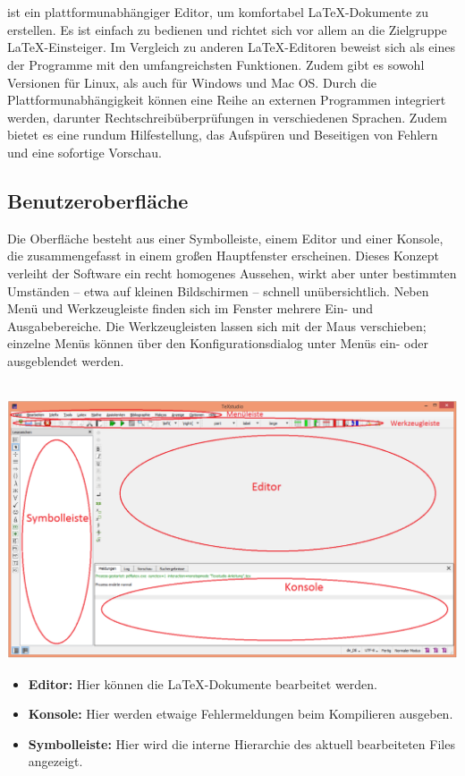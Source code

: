 \section{\texstud}
\texstud  ist ein plattformunabhängiger Editor, um komfortabel \LaTeX -Dokumente zu
erstellen. Es ist einfach zu bedienen und richtet sich vor allem an die Zielgruppe \LaTeX -Einsteiger.
Im Vergleich zu anderen \LaTeX -Editoren beweist sich \texstud als eines der
Programme mit den umfangreichsten Funktionen. Zudem gibt es sowohl Versionen für
Linux, als auch für Windows und Mac OS. Durch die Plattformunabhängigkeit können
eine Reihe an externen Programmen integriert werden, darunter Rechtschreibüberprüfungen in verschiedenen Sprachen. Zudem bietet es eine rundum
Hilfestellung, das Aufspüren und Beseitigen von Fehlern und eine sofortige Vorschau.

\subsection{Benutzeroberfläche}
Die Oberfläche besteht aus einer Symbolleiste, einem Editor und einer Konsole, die
zusammengefasst in einem großen Hauptfenster erscheinen. Dieses Konzept verleiht der
Software ein recht homogenes Aussehen, wirkt aber unter bestimmten Umständen – etwa
auf kleinen Bildschirmen – schnell unübersichtlich. Neben Menü und Werkzeugleiste finden sich im Fenster mehrere Ein- und Ausgabebereiche. Die Werkzeugleisten lassen sich mit der Maus verschieben; einzelne Menüs können über den Konfigurationsdialog unter Menüs ein- oder ausgeblendet werden. \\\\
\begin{minipage}[h]{\textwidth}
	\centering	
	\includegraphics[width=\textwidth]{images/texstudiogui}
	\label{fig:gui}
\end{minipage}\clearpage
\begin{itemize}
	\item \textbf{Editor:} Hier können die \LaTeX -Dokumente bearbeitet werden.%
	\item	\textbf{Konsole:} Hier werden etwaige Fehlermeldungen beim Kompilieren ausgeben.
	\item \textbf{Symbolleiste:} Hier wird die interne Hierarchie des aktuell bearbeiteten Files angezeigt. \\
\end{itemize}

